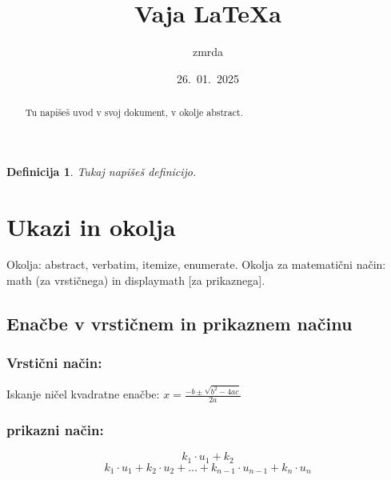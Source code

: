 \documentclass[a4paper]{article}
\begin{document}

\title{Vaja \LaTeX a}
\author{zmrda}
\date{26.\ 01.\ 2025}
\maketitle 


\begin{abstract}
    Tu napišeš uvod v svoj dokument, v okolje abstract.
\end{abstract}
\newpage

\tableofcontents
\pagebreak

\newtheorem{definition}{Definicija}
\begin{definition}
    Tukaj napišeš definicijo.
\end{definition}



\section{Ukazi in okolja}

Okolja: abstract, verbatim, itemize, enumerate. 
Okolja za matematični način: math (za vrstičnega) in displaymath 
[za prikaznega]. 


\subsection{Enačbe v vrstičnem in prikaznem načinu}
\subsubsection{Vrstični način:}
Iskanje ničel kvadratne enačbe: \(x = \frac{-b \pm \sqrt{b^2 - 4ac}}{2a}\)


\subsubsection{prikazni način:}
\begin{center}
   \[k_1\cdot u_1+k_2\]
   \[k_1 \cdot u_1 + k_2 \cdot u_2 + \ldots + k_{n-1} \cdot u_{n-1} + k_n \cdot u_n\]

\end{center}%
\end{document}
